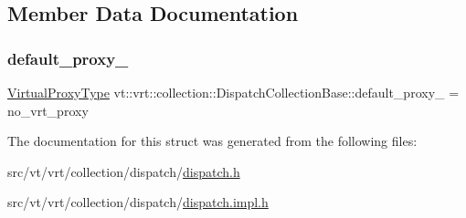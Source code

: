 \subsection{Member Data Documentation}
\mbox{\label{structvt_1_1vrt_1_1collection_1_1_dispatch_collection_base_ad192b793a3929262a6b44951b628d215}} 
\subsubsection{\texorpdfstring{default\+\_\+proxy\+\_\+}{default\_proxy\_}}
{\footnotesize\ttfamily \hyperlink{namespacevt_a1b417dd5d684f045bb58a0ede70045ac}{Virtual\+Proxy\+Type} vt\+::vrt\+::collection\+::\+Dispatch\+Collection\+Base\+::default\+\_\+proxy\+\_\+ = no\+\_\+vrt\+\_\+proxy\hspace{0.3cm}{\ttfamily [private]}}



The documentation for this struct was generated from the following files\+:\begin{DoxyCompactItemize}
\item 
src/vt/vrt/collection/dispatch/\hyperlink{vrt_2collection_2dispatch_2dispatch_8h}{dispatch.\+h}\item 
src/vt/vrt/collection/dispatch/\hyperlink{vrt_2collection_2dispatch_2dispatch_8impl_8h}{dispatch.\+impl.\+h}\end{DoxyCompactItemize}
